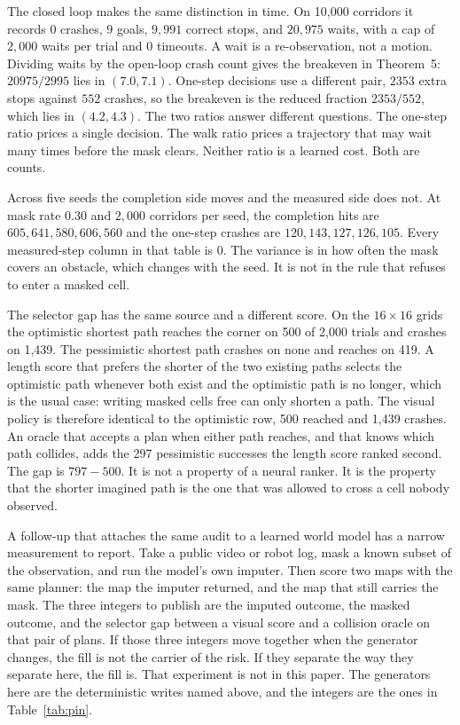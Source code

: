 \documentclass[10pt,twocolumn,letterpaper]{article}
\begin{document}
The closed loop makes the same distinction in time.
On 10{,}000 corridors it records $0$ crashes, $9$ goals, $9{,}991$ correct stops, and $20{,}975$ waits, with a cap of $2{,}000$ waits per trial and $0$ timeouts.
A wait is a re-observation, not a motion.
Dividing waits by the open-loop crash count gives the breakeven in Theorem~5: $20975/2995$ lies in $(7.0, 7.1)$.
One-step decisions use a different pair, $2353$ extra stops against $552$ crashes, so the breakeven is the reduced fraction $2353/552$, which lies in $(4.2, 4.3)$.
The two ratios answer different questions.
The one-step ratio prices a single decision.
The walk ratio prices a trajectory that may wait many times before the mask clears.
Neither ratio is a learned cost.
Both are counts.

Across five seeds the completion side moves and the measured side does not.
At mask rate $0.30$ and $2{,}000$ corridors per seed, the completion hits are $605,641,580,606,560$ and the one-step crashes are $120,143,127,126,105$.
Every measured-step column in that table is $0$.
The variance is in how often the mask covers an obstacle, which changes with the seed.
It is not in the rule that refuses to enter a masked cell.

The selector gap has the same source and a different score.
On the $16{\times}16$ grids the optimistic shortest path reaches the corner on 500 of 2{,}000 trials and crashes on 1{,}439.
The pessimistic shortest path crashes on none and reaches on 419.
A length score that prefers the shorter of the two existing paths selects the optimistic path whenever both exist and the optimistic path is no longer, which is the usual case: writing masked cells free can only shorten a path.
The visual policy is therefore identical to the optimistic row, 500 reached and 1{,}439 crashes.
An oracle that accepts a plan when either path reaches, and that knows which path collides, adds the 297 pessimistic successes the length score ranked second.
The gap is $797-500$.
It is not a property of a neural ranker.
It is the property that the shorter imagined path is the one that was allowed to cross a cell nobody observed.

A follow-up that attaches the same audit to a learned world model has a narrow measurement to report.
Take a public video or robot log, mask a known subset of the observation, and run the model's own imputer.
Then score two maps with the same planner: the map the imputer returned, and the map that still carries the mask.
The three integers to publish are the imputed outcome, the masked outcome, and the selector gap between a visual score and a collision oracle on that pair of plans.
If those three integers move together when the generator changes, the fill is not the carrier of the risk.
If they separate the way they separate here, the fill is.
That experiment is not in this paper.
The generators here are the deterministic writes named above, and the integers are the ones in Table~\ref{tab:pin}.
\end{document}

